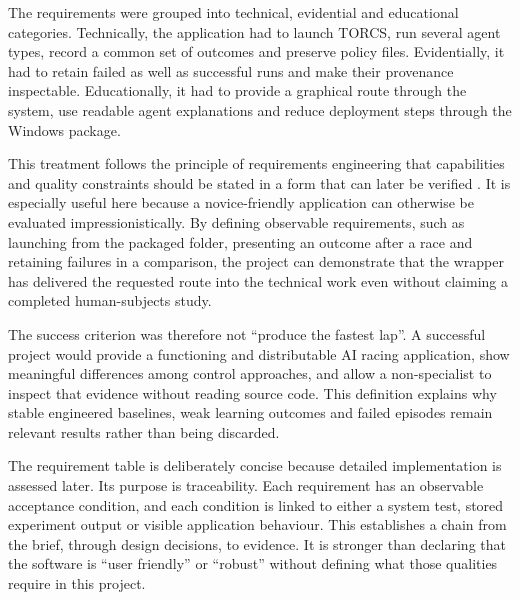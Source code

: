 The requirements were grouped into technical, evidential and educational categories. Technically, the application had to launch TORCS, run several agent types, record a common set of outcomes and preserve policy files. Evidentially, it had to retain failed as well as successful runs and make their provenance inspectable. Educationally, it had to provide a graphical route through the system, use readable agent explanations and reduce deployment steps through the Windows package.

This treatment follows the principle of requirements engineering that capabilities and quality constraints should be stated in a form that can later be verified \parencite{iso29148}. It is especially useful here because a novice-friendly application can otherwise be evaluated impressionistically. By defining observable requirements, such as launching from the packaged folder, presenting an outcome after a race and retaining failures in a comparison, the project can demonstrate that the wrapper has delivered the requested route into the technical work even without claiming a completed human-subjects study.

The success criterion was therefore not \enquote{produce the fastest lap}. A successful project would provide a functioning and distributable AI racing application, show meaningful differences among control approaches, and allow a non-specialist to inspect that evidence without reading source code. This definition explains why stable engineered baselines, weak learning outcomes and failed episodes remain relevant results rather than being discarded.

The requirement table is deliberately concise because detailed implementation is assessed later. Its purpose is traceability. Each requirement has an observable acceptance condition, and each condition is linked to either a system test, stored experiment output or visible application behaviour. This establishes a chain from the brief, through design decisions, to evidence. It is stronger than declaring that the software is \enquote{user friendly} or \enquote{robust} without defining what those qualities require in this project.

